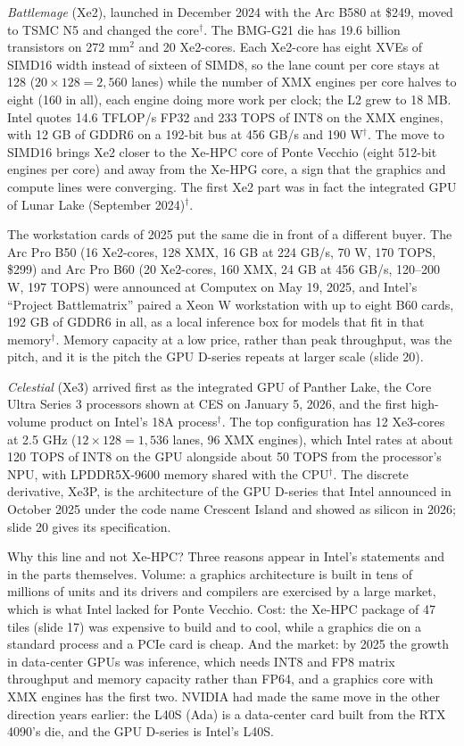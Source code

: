 \documentclass[11pt,letterpaper]{article}
\begin{document}
\emph{Battlemage} (Xe2), launched in December 2024 with the Arc B580 at \$249, moved to TSMC N5 and changed the core$^\dagger$. The BMG-G21 die has 19.6 billion transistors on 272 mm$^2$ and 20 Xe2-cores. Each Xe2-core has eight XVEs of SIMD16 width instead of sixteen of SIMD8, so the lane count per core stays at 128 ($20 \times 128 = 2{,}560$ lanes) while the number of XMX engines per core halves to eight (160 in all), each engine doing more work per clock; the L2 grew to 18 MB. Intel quotes 14.6 TFLOP/s FP32 and 233 TOPS of INT8 on the XMX engines, with 12 GB of GDDR6 on a 192-bit bus at 456 GB/s and 190 W$^\dagger$. The move to SIMD16 brings Xe2 closer to the Xe-HPC core of Ponte Vecchio (eight 512-bit engines per core) and away from the Xe-HPG core, a sign that the graphics and compute lines were converging. The first Xe2 part was in fact the integrated GPU of Lunar Lake (September 2024)$^\dagger$.

The workstation cards of 2025 put the same die in front of a different buyer. The Arc Pro B50 (16 Xe2-cores, 128 XMX, 16 GB at 224 GB/s, 70 W, 170 TOPS, \$299) and Arc Pro B60 (20 Xe2-cores, 160 XMX, 24 GB at 456 GB/s, 120--200 W, 197 TOPS) were announced at Computex on May 19, 2025, and Intel's ``Project Battlematrix'' paired a Xeon W workstation with up to eight B60 cards, 192 GB of GDDR6 in all, as a local inference box for models that fit in that memory$^\dagger$. Memory capacity at a low price, rather than peak throughput, was the pitch, and it is the pitch the GPU D-series repeats at larger scale (slide 20).

\emph{Celestial} (Xe3) arrived first as the integrated GPU of Panther Lake, the Core Ultra Series 3 processors shown at CES on January 5, 2026, and the first high-volume product on Intel's 18A process$^\dagger$. The top configuration has 12 Xe3-cores at 2.5 GHz ($12 \times 128 = 1{,}536$ lanes, 96 XMX engines), which Intel rates at about 120 TOPS of INT8 on the GPU alongside about 50 TOPS from the processor's NPU, with LPDDR5X-9600 memory shared with the CPU$^\dagger$. The discrete derivative, Xe3P, is the architecture of the GPU D-series that Intel announced in October 2025 under the code name Crescent Island and showed as silicon in 2026; slide 20 gives its specification.

Why this line and not Xe-HPC? Three reasons appear in Intel's statements and in the parts themselves. Volume: a graphics architecture is built in tens of millions of units and its drivers and compilers are exercised by a large market, which is what Intel lacked for Ponte Vecchio. Cost: the Xe-HPC package of 47 tiles (slide 17) was expensive to build and to cool, while a graphics die on a standard process and a PCIe card is cheap. And the market: by 2025 the growth in data-center GPUs was inference, which needs INT8 and FP8 matrix throughput and memory capacity rather than FP64, and a graphics core with XMX engines has the first two. NVIDIA had made the same move in the other direction years earlier: the L40S (Ada) is a data-center card built from the RTX 4090's die, and the GPU D-series is Intel's L40S.
\end{document}
